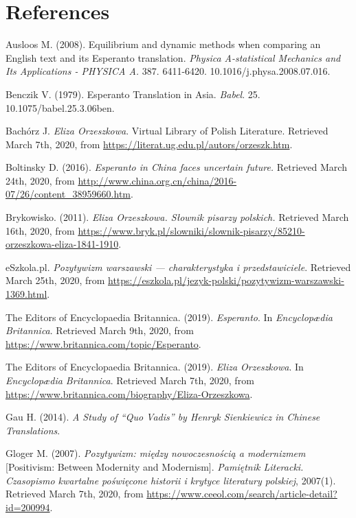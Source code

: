 \chapter*{References}


Ausloos M. (2008). Equilibrium and dynamic methods when comparing an English text and its Esperanto translation. \textit{Physica A-statistical Mechanics and Its Applications - PHYSICA A.} 387. 6411-6420. 10.1016/j.physa.2008.07.016. 

Benczik V. (1979). Esperanto Translation in Asia. \textit{Babel}. 25. 10.1075/babel.25.3.06ben. 

Bachórz J. \textit{Eliza Orzeszkowa}. Virtual Library of Polish Literature. Retrieved March 7th, 2020, from \url{https://literat.ug.edu.pl/autors/orzeszk.htm}.

Boltinsky D. (2016). \textit{Esperanto in China faces uncertain future.} Retrieved March 24th, 2020, from \url{http://www.china.org.cn/china/2016-07/26/content_38959660.htm}.

Brykowisko. (2011). \textit{Eliza Orzeszkowa. Słownik pisarzy polskich.} Retrieved March 16th, 2020, from \url{https://www.bryk.pl/slowniki/slownik-pisarzy/85210-orzeszkowa-eliza-1841-1910}.

eSzkola.pl. \textit{Pozytywizm warszawski --- charakterystyka i przedstawiciele}. Retrieved March 25th, 2020, from \url{https://eszkola.pl/jezyk-polski/pozytywizm-warszawski-1369.html}.

The Editors of Encyclopaedia Britannica. (2019). \textit{Esperanto}. In \textit{Encyclopædia Britannica}. Retrieved March 9th, 2020, from \url{https://www.britannica.com/topic/Esperanto}.

The Editors of Encyclopaedia Britannica. (2019). \textit{Eliza Orzeszkowa}. In \textit{Encyclopædia Britannica}. Retrieved March 7th, 2020, from \url{https://www.britannica.com/biography/Eliza-Orzeszkowa}.

Gau H. (2014). \textit{A Study of “Quo Vadis” by Henryk Sienkiewicz in Chinese Translations}. 

Gloger M. (2007). \textit{Pozytywizm: między nowoczesnością a modernizmem} [Positivism: Between Modernity and Modernism]. \textit{Pamiętnik Literacki. Czasopismo kwartalne poświęcone historii i krytyce literatury polskiej}, 2007(1). Retrieved March 7th, 2020, from \url{https://www.ceeol.com/search/article-detail?id=200994}.

